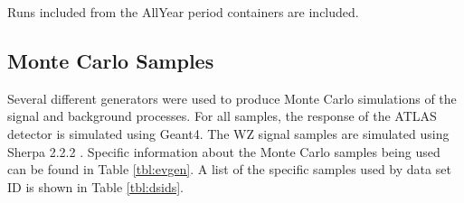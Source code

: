 Runs included from the AllYear period containers are included.

\subsection{Monte Carlo Samples}

Several different generators were used to produce Monte Carlo simulations of the signal and background processes. For all samples, the response of the ATLAS detector is simulated using Geant4. The WZ signal samples are simulated using Sherpa 2.2.2 \cite{sherpa}. Specific information about the Monte Carlo samples being used can be found in Table \ref{tbl:evgen}. A list of the specific samples used by data set ID is shown in Table \ref{tbl:dsids}.

\begin{table}[H]
\begin{center}
\caption{\label{tbl:evgen} The configurations used for event generation of signal and background processes, including the event generator, matrix element (ME) order, parton shower algorithm, and parton distribution functin (PDF). }
\end{center}
\end{table}
